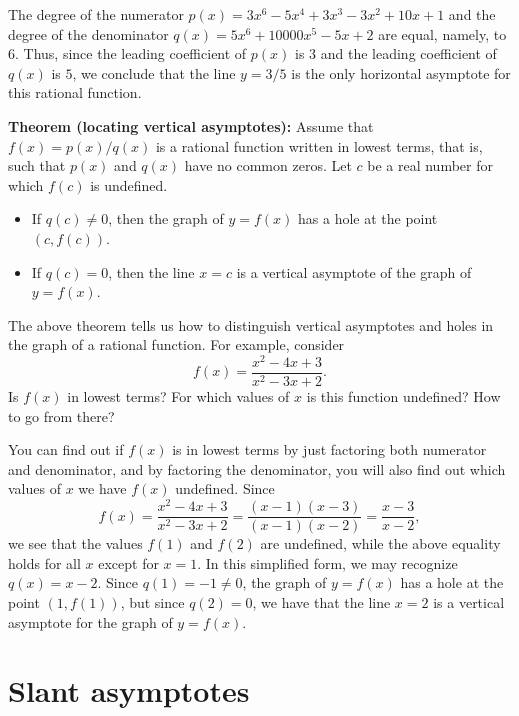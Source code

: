 \documentclass{ximera}
\begin{document}
\begin{explanation}
  The degree of the numerator $p(x) = 3x^6-5x^4+3x^3-3x^2 + 10x + 1$ and the degree of the denominator $q(x) = 5x^6 + 10000x^5 - 5x+2$ are equal, namely, to $6$. Thus, since the leading coefficient of $p(x)$ is $3$ and the leading coefficient of $q(x)$ is $5$, we conclude that the line $y=3/5$ is the only horizontal asymptote for this rational function.
\end{explanation}

\begin{callout}
  {\bf Theorem (locating vertical asymptotes):} Assume that $f(x) = p(x)/q(x)$ is a rational function written in lowest terms, that is, such that $p(x)$ and $q(x)$ have no common zeros. Let $c$ be a real number for which $f(c)$ is undefined.
  \begin{itemize}
  \item If $q(c) \neq 0$, then the graph of $y = f(x)$ has a hole at the point $(c,f(c))$.
  \item If $q(c) = 0$, then the line $x=c$ is a vertical asymptote of the graph of $y=f(x)$.
  \end{itemize}
\end{callout}

The above theorem tells us how to distinguish vertical asymptotes and holes in the graph of a rational function. For example, consider \[  f(x) = \frac{x^2-4x+3}{x^2-3x+2}.  \]Is $f(x)$ in lowest terms? For which values of $x$ is this function undefined? How to go from there?

\begin{explanation}
You can find out if $f(x)$ is in lowest terms by just factoring both numerator and denominator, and by factoring the denominator, you will also find out which values of $x$ we have $f(x)$ undefined. Since \[   f(x) = \frac{x^2-4x+3}{x^2-3x+2} = \frac{(x-1)(x-3)}{(x-1)(x-2)} = \frac{x-3}{x-2},  \]we see that the values $f(1)$ and $f(2)$ are undefined, while the above equality holds for all $x$ except for $x=1$. In this simplified form, we may recognize $q(x) = x-2$. Since $q(1) = -1 \neq 0$, the graph of $y=f(x)$ has a hole at the point $(1,f(1))$, but since $q(2) = 0$, we have that the line $x=2$ is a vertical asymptote for the graph of $y=f(x)$.
\end{explanation}

\section{Slant asymptotes}
\end{document}
